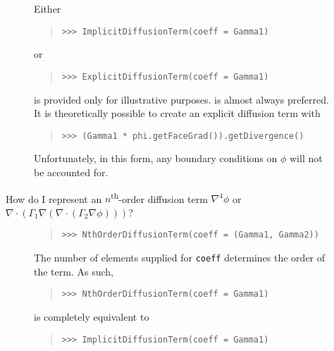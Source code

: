 \begin{description}
\begin{description}
            Either
           \begin{quote}
\begin{verbatim}
>>> ImplicitDiffusionTerm(coeff = Gamma1)
\end{verbatim}
           \end{quote}
           or 
           \begin{quote}
\begin{verbatim}
>>> ExplicitDiffusionTerm(coeff = Gamma1)
\end{verbatim}
           \end{quote}
            is provided only for illustrative purposes.
            is almost always preferred. It is
           theoretically possible to create an explicit diffusion term with
           \begin{quote}
\begin{verbatim}
>>> (Gamma1 * phi.getFaceGrad()).getDivergence()
\end{verbatim}
           \end{quote}
           Unfortunately, in this form, any boundary conditions on $\phi$
           will not be accounted for.

            
            \item[How do I represent an $n$\textsuperscript{th}-order 
            diffusion term $\nabla^4 \phi$ or
            $\nabla \cdot \left( \Gamma_1 \nabla \left(
            \nabla\cdot\left( 
            \Gamma_2 \nabla \phi\right) \right) \right) $?]
            \hspace*{\fill}
            
            \begin{quote}
\begin{verbatim}
>>> NthOrderDiffusionTerm(coeff = (Gamma1, Gamma2))
\end{verbatim}
            \end{quote}
            The number of elements supplied for \verb|coeff| determines the
            order of the term. As such,
            \begin{quote}
\begin{verbatim}
>>> NthOrderDiffusionTerm(coeff = Gamma1)
\end{verbatim}
            \end{quote}
            is completely equivalent to
            \begin{quote}
\begin{verbatim}
>>> ImplicitDiffusionTerm(coeff = Gamma1)
\end{verbatim}
            \end{quote}


\end{description}
\end{description}
